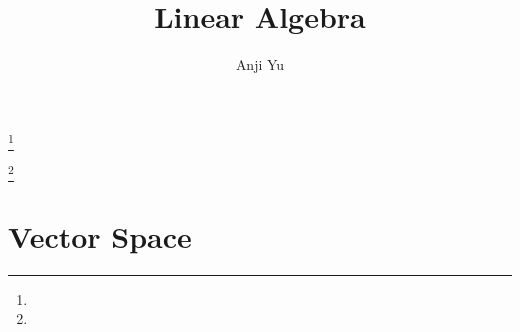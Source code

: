 \documentclass{amsbook}
\theoremstyle{definition}
\theoremstyle{remark}
\numberwithin{section}{chapter}
\numberwithin{equation}{chapter}
\begin{document}
\frontmatter

\title{Linear Algebra}


\author{Anji Yu}
\address{}
\curraddr{}
\email{}
\thanks{}

\author{}
\address{}
\curraddr{}
\email{}
\thanks{}


\keywords{}

\date{}

\begin{abstract}
\end{abstract}

\maketitle


\setcounter{page}{4}

\tableofcontents



\mainmatter
\chapter{Vector Space}
\end{document}
